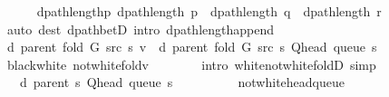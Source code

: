 \begin{isabellebody}
\ \ \ \ \isamarkupfalse%
\ dpath{\isacharunderscore}{\kern0pt}length{\isacharunderscore}{\kern0pt}p{\isacharcolon}{\kern0pt}\ {\isachardoublequoteopen}dpath{\isacharunderscore}{\kern0pt}length\ p\ {\isacharequal}{\kern0pt}\ dpath{\isacharunderscore}{\kern0pt}length\ q\ {\isacharplus}{\kern0pt}\ dpath{\isacharunderscore}{\kern0pt}length\ r{\isachardoublequoteclose}\isanewline
\ \ \ \ \ \ \isamarkupfalse%
\ {\isacharparenleft}{\kern0pt}auto\ dest{\isacharcolon}{\kern0pt}\ dpath{\isacharunderscore}{\kern0pt}betD{\isacharparenleft}{\kern0pt}{}{\isacharminus}{\kern0pt}{}{\isacharparenright}{\kern0pt}\ intro{\isacharcolon}{\kern0pt}\ dpath{\isacharunderscore}{\kern0pt}length{\isacharunderscore}{\kern0pt}append{\isacharunderscore}{\kern0pt}{}{\isacharparenright}{\kern0pt}\isanewline
\isanewline
\ \ \ \ \isamarkupfalse%
\ {\isachardoublequoteopen}d\ {\isacharparenleft}{\kern0pt}parent\ {\isacharparenleft}{\kern0pt}fold\ G\ src\ s{\isacharparenright}{\kern0pt}{\isacharparenright}{\kern0pt}\ v\ {\isacharequal}{\kern0pt}\ d\ {\isacharparenleft}{\kern0pt}parent\ {\isacharparenleft}{\kern0pt}fold\ G\ src\ s{\isacharparenright}{\kern0pt}{\isacharparenright}{\kern0pt}\ {\isacharparenleft}{\kern0pt}Q{\isacharunderscore}{\kern0pt}head\ {\isacharparenleft}{\kern0pt}queue\ s{\isacharparenright}{\kern0pt}{\isacharparenright}{\kern0pt}\ {\isacharplus}{\kern0pt}\ {}{\isachardoublequoteclose}\isanewline
\ \ \ \ \ \ \isamarkupfalse%
\ black{\isacharunderscore}{\kern0pt}white\ not{\isacharunderscore}{\kern0pt}white{\isacharunderscore}{\kern0pt}fold{\isacharunderscore}{\kern0pt}v\isanewline
\ \ \ \ \ \ \isamarkupfalse%
\ {\isacharparenleft}{\kern0pt}intro\ white{\isacharunderscore}{\kern0pt}not{\isacharunderscore}{\kern0pt}white{\isacharunderscore}{\kern0pt}foldD{\isacharparenleft}{\kern0pt}{}{\isacharparenright}{\kern0pt}{\isacharparenright}{\kern0pt}\ simp\isanewline
\ \ \ \ \isamarkupfalse%
\ \isamarkupfalse%
\ {\isachardoublequoteopen}{\isachardot}{\kern0pt}{\isachardot}{\kern0pt}{\isachardot}{\kern0pt}\ {\isacharequal}{\kern0pt}\ d\ {\isacharparenleft}{\kern0pt}parent\ s{\isacharparenright}{\kern0pt}\ {\isacharparenleft}{\kern0pt}Q{\isacharunderscore}{\kern0pt}head\ {\isacharparenleft}{\kern0pt}queue\ s{\isacharparenright}{\kern0pt}{\isacharparenright}{\kern0pt}\ {\isacharplus}{\kern0pt}\ {}{\isachardoublequoteclose}\isanewline
\ \ \ \ \ \ \isamarkupfalse%
\ not{\isacharunderscore}{\kern0pt}white{\isacharunderscore}{\kern0pt}head{\isacharunderscore}{\kern0pt}queue\isanewline

\end{isabellebody}

